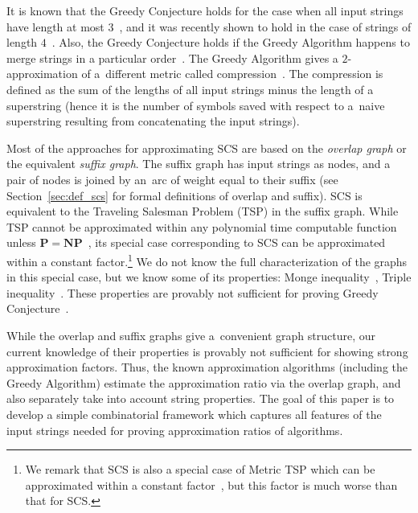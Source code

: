 It is known that the Greedy Conjecture holds for the case when all input strings have length at most $3$~\cite{TU1988, cazaux20143}, and it was recently shown to hold in the case of strings of length $4$~\cite{kulikov2015greedy}. Also, the Greedy Conjecture holds if the Greedy Algorithm happens to merge strings in a particular order~\cite{weinard2006greedy, laube2005conditional}. The Greedy Algorithm gives a $2$-approximation of a~different metric called compression~\cite{TU1988}. The compression is defined as the sum of the lengths of all input strings minus the length of a superstring
(hence it is the number of symbols saved with respect to a~naive superstring resulting from concatenating the input strings).



Most of the approaches for approximating SCS are based on the
{\em overlap graph} or the equivalent \emph{suffix graph}. The suffix graph has input strings as nodes, and a pair of nodes 
is joined by an~arc of weight equal to their suffix (see Section~\ref{sec:def_scs} for formal definitions of overlap and suffix).
SCS is equivalent to the Traveling Salesman Problem (TSP) in the suffix graph. While TSP cannot be approximated within any polynomial time computable function unless $\mathbf{P}=\mathbf{NP}$~\cite{SG1976}, its special case corresponding to SCS can be approximated within a constant factor.\footnote{We remark that SCS is also a special case of Metric TSP which can be approximated within a constant factor~\cite{svensson2018constant}, but this factor is much worse than that for SCS.} We do not know the full characterization of the graphs in this special case, but we know some of its properties: Monge inequality~\cite{monge}, Triple inequality~\cite{weinard2006greedy}. These properties are provably not sufficient for proving Greedy Conjecture~\cite{weinard2006greedy, laube2005conditional}. 

While the overlap and suffix graphs give a~convenient graph structure, our current knowledge of their properties is provably not sufficient for showing strong approximation factors. Thus, the known approximation algorithms (including the Greedy Algorithm) estimate the approximation ratio via the overlap graph, and also separately take into account string properties. The goal of this paper is to develop a simple combinatorial framework which captures all features of the input strings needed for proving approximation ratios of algorithms.


